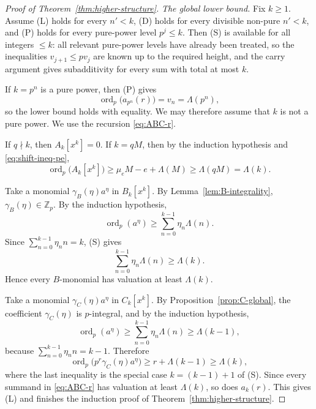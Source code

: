\documentclass[10pt,a4paper]{amsart}
\newcommand{\Zp}{\mathbb{Z}_p}
\DeclareMathOperator{\ordop}{ord}
\newcommand{\vp}{\ordop_p}
\begin{document}
\begin{proof}[Proof of Theorem~\ref{thm:higher-structure}]
\smallskip
\noindent\emph{The global lower bound.}
Fix $k\ge1$.  Assume (L) holds for every $n'<k$, (D) holds for every divisible non-pure $n'<k$, and (P) holds for every pure-power level $p^j\le k$.  Then (S) is available for all integers $\le k$: all relevant pure-power levels have already been treated, so the inequalities $v_{j+1}\le p v_j$ are known up to the required height, and the carry argument gives subadditivity for every sum with total at most $k$.

If $k=p^n$ is a pure power, then (P) gives
\[
        \vp\bigl(a_{p^n}(r)\bigr)=v_n=\Lambda(p^n),
\]
so the lower bound holds with equality.  We may therefore assume that $k$ is not a pure power.  We use the recursion \eqref{eq:ABC-r}.

If $q\nmid k$, then $A_k[x^k]=0$.  If $k=qM$, then by the induction hypothesis and \eqref{eq:shift-ineq-pe},
\[
        \vp\bigl(A_k[x^k]\bigr)\ge \mu_eM-e+\Lambda(M)\ge \Lambda(qM)=\Lambda(k).
\]

Take a monomial $\gamma_B(\eta)a^\eta$ in $B_k[x^k]$.  By Lemma~\ref{lem:B-integrality}, $\gamma_B(\eta)\in\Zp$.  By the induction hypothesis,
\[
        \vp(a^\eta)\ge \sum_{n=0}^{k-1}\eta_n\Lambda(n).
\]
Since $\sum_{n=0}^{k-1}\eta_n n=k$, (S) gives
\[
        \sum_{n=0}^{k-1}\eta_n\Lambda(n)\ge \Lambda(k).
\]
Hence every $B$-monomial has valuation at least $\Lambda(k)$.

Take a monomial $\gamma_C(\eta)a^\eta$ in $C_k[x^k]$.  By Proposition~\ref{prop:C-global}, the coefficient $\gamma_C(\eta)$ is $p$-integral, and by the induction hypothesis,
\[
        \vp(a^\eta)\ge \sum_{n=0}^{k-1}\eta_n\Lambda(n)\ge \Lambda(k-1),
\]
because $\sum_{n=0}^{k-1}\eta_n n=k-1$.  Therefore
\[
        \vp\bigl(p^r\gamma_C(\eta)a^\eta\bigr)
        \ge r+\Lambda(k-1)\ge \Lambda(k),
\]
where the last inequality is the special case $k=(k-1)+1$ of (S).  Since every summand in \eqref{eq:ABC-r} has valuation at least $\Lambda(k)$, so does $a_k(r)$.  This gives (L) and finishes the induction proof of Theorem~\ref{thm:higher-structure}.
\end{proof}
\end{document}
